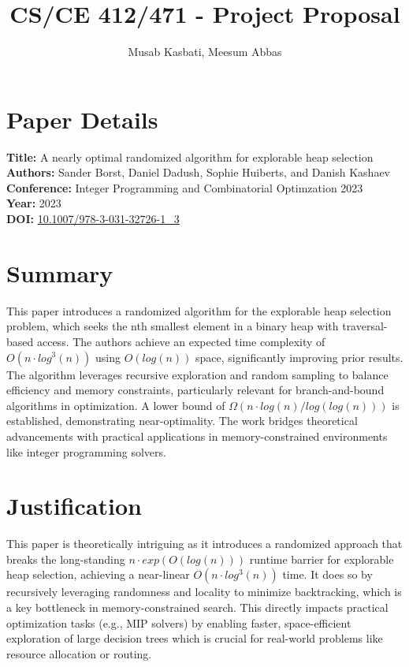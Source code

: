 \documentclass{article}
\title{CS/CE 412/471 - Project Proposal}
\author{Musab Kasbati, Meesum Abbas}
\date{}
\begin{document}
\maketitle

\section{Paper Details}
\textbf{Title:} A nearly optimal randomized algorithm for explorable heap selection \\
\textbf{Authors:}  Sander Borst, Daniel Dadush, Sophie Huiberts, and Danish Kashaev\\
\textbf{Conference:} Integer Programming and Combinatorial Optimzation 2023\\
\textbf{Year:} 2023 \\
\textbf{DOI:} \href{https://doi.org/10.1007/978-3-031-32726-1_3}{10.1007/978-3-031-32726-1\_3} \\

\section{Summary}
This paper introduces a randomized algorithm for the explorable heap selection problem, which seeks the nth smallest element in a binary heap with traversal-based access. The authors achieve an expected time complexity of $O(n \cdot log^3 (n))$ using $O(log (n))$ space, significantly improving prior results. The algorithm leverages recursive exploration and random sampling to balance efficiency and memory constraints, particularly relevant for branch-and-bound algorithms in optimization. A lower bound of $\Omega(n \cdot log(n) / log(log (n)))$ is established, demonstrating near-optimality. The work bridges theoretical advancements with practical applications in memory-constrained environments like integer programming solvers.


\section{Justification}

This paper is theoretically intriguing as it introduces a randomized approach that breaks the long-standing $n \cdot exp(O(log(n)))$
runtime barrier for explorable heap selection, achieving a near-linear $O(n \cdot log^3(n))$ time. It does so by recursively leveraging randomness and locality to minimize backtracking,  which is a key bottleneck in memory-constrained search. This directly impacts practical optimization tasks (e.g., MIP solvers) by enabling faster, space-efficient exploration of large decision trees which is crucial for real-world problems like resource allocation or routing.
\end{document}
